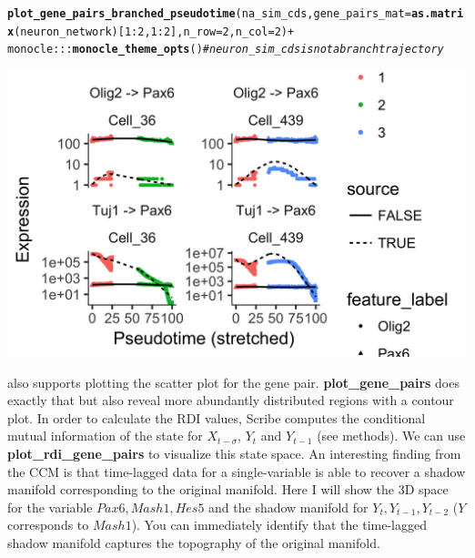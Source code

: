 \documentclass[10pt,oneside]{article}\usepackage[]{graphicx}\usepackage[]{color}
\makeatletter
\def\maxwidth{ %
  \ifdim\Gin@nat@width>\linewidth
    \linewidth
  \else
    \Gin@nat@width
  \fi
}
\newcommand{\hlnum}[1]{\textcolor[rgb]{0.686,0.059,0.569}{#1}}%
\newcommand{\hlcom}[1]{\textcolor[rgb]{0.678,0.584,0.686}{\textit{#1}}}%
\newcommand{\hlopt}[1]{\textcolor[rgb]{0,0,0}{#1}}%
\newcommand{\hlstd}[1]{\textcolor[rgb]{0.345,0.345,0.345}{#1}}%
\newcommand{\hlkwc}[1]{\textcolor[rgb]{0.333,0.667,0.333}{#1}}%
\newcommand{\hlkwd}[1]{\textcolor[rgb]{0.737,0.353,0.396}{\textbf{#1}}}%
\newenvironment{kframe}{%
 \def\at@end@of@kframe{}%
 \ifinner\ifhmode%
  \def\at@end@of@kframe{\end{minipage}}%
  \begin{minipage}{\columnwidth}%
 \fi\fi%
 \def\FrameCommand##1{\hskip\@totalleftmargin \hskip-\fboxsep
 \colorbox{shadecolor}{##1}\hskip-\fboxsep
     \hskip-\linewidth \hskip-\@totalleftmargin \hskip\columnwidth}%
 \MakeFramed {\advance\hsize-\width
   \@totalleftmargin\z@ \linewidth\hsize
   \@setminipage}}%
 {\par\unskip\endMakeFramed%
 \at@end@of@kframe}
\newenvironment{knitrout}{}{} %
\makeatother
\begin{document}
\begin{knitrout}
{}


\begin{kframe}\begin{alltt}
\hlkwd{plot_gene_pairs_branched_pseudotime}\hlstd{(na_sim_cds,} \hlkwc{gene_pairs_mat} \hlstd{=} \hlkwd{as.matrix}\hlstd{(neuron_network)[}\hlnum{1}\hlopt{:}\hlnum{2}\hlstd{,} \hlnum{1}\hlopt{:}\hlnum{2}\hlstd{],} \hlkwc{n_row} \hlstd{=} \hlnum{2}\hlstd{,} \hlkwc{n_col} \hlstd{=} \hlnum{2}\hlstd{)} \hlopt{+}
  \hlstd{monocle}\hlopt{:::}\hlkwd{monocle_theme_opts}\hlstd{()} \hlcom{# neuron_sim_cds is not a branch trajectory }
\end{alltt}
\end{kframe}

{\centering \includegraphics[width=\maxwidth]{figure/gene_pairwise_kinetic_plot-2} 

}



\end{knitrout}

 also supports plotting the scatter plot for the gene pair. \textbf{plot\_gene\_pairs} does exactly that but also reveal more abundantly distributed regions with a contour plot. In order to calculate the RDI values, Scribe computes the conditional mutual information of the state for $X_{t - \sigma}$, $Y_t$ and $Y_{t - 1}$ (see methods). We can use \textbf{plot\_rdi\_gene\_pairs} to visualize this state space. An interesting finding from the CCM is that time-lagged data for a single-variable is able to recover a shadow manifold corresponding to the original manifold. Here I will show the 3D space for the variable $Pax6, Mash1, Hes5$ and the shadow manifold for $Y_t, Y_{t - 1}, Y_{t - 2}$ ($Y$ corresponds to $Mash1$). You can immediately identify that the time-lagged shadow manifold captures the topography of the original manifold.
\end{document}

